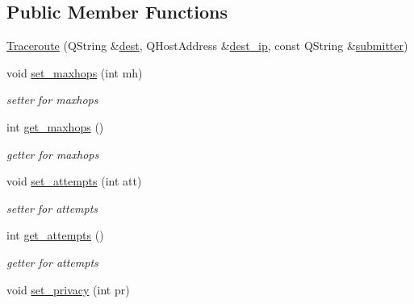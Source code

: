 \subsection*{Public Member Functions}
\begin{CompactItemize}
\item 
\hyperlink{classTraceroute_974f65271f48eabb3e4ff6be4bcada46}{Traceroute} (QString \&\hyperlink{classTraceroute_b045e5f196f24f4a3c606e0b834dbe2d}{dest}, QHostAddress \&\hyperlink{classTraceroute_4266d652220298885707ac2982b6cb98}{dest\_\-ip}, const QString \&\hyperlink{classTraceroute_eafa630c4871ad2ac89fce1aa75fe6e0}{submitter})
\item 
\hypertarget{classTraceroute_5f9a5dc58a244651e23060b3f560d31b}{
void \hyperlink{classTraceroute_5f9a5dc58a244651e23060b3f560d31b}{set\_\-maxhops} (int mh)}
\label{classTraceroute_5f9a5dc58a244651e23060b3f560d31b}

\begin{CompactList}\small\item\em setter for maxhops \item\end{CompactList}\item 
\hypertarget{classTraceroute_1c55e9ec568ebc74b73e2543554ff8e7}{
int \hyperlink{classTraceroute_1c55e9ec568ebc74b73e2543554ff8e7}{get\_\-maxhops} ()}
\label{classTraceroute_1c55e9ec568ebc74b73e2543554ff8e7}

\begin{CompactList}\small\item\em getter for maxhops \item\end{CompactList}\item 
\hypertarget{classTraceroute_ea9c00d02db1b123903e8b412210a7ca}{
void \hyperlink{classTraceroute_ea9c00d02db1b123903e8b412210a7ca}{set\_\-attempts} (int att)}
\label{classTraceroute_ea9c00d02db1b123903e8b412210a7ca}

\begin{CompactList}\small\item\em setter for attempts \item\end{CompactList}\item 
\hypertarget{classTraceroute_1a0f304f680f57f40e825bd8b29b58e5}{
int \hyperlink{classTraceroute_1a0f304f680f57f40e825bd8b29b58e5}{get\_\-attempts} ()}
\label{classTraceroute_1a0f304f680f57f40e825bd8b29b58e5}

\begin{CompactList}\small\item\em getter for attempts \item\end{CompactList}\item 
\hypertarget{classTraceroute_01cf3f6c06cc7c167d782ab2ba3f111f}{
void \hyperlink{classTraceroute_01cf3f6c06cc7c167d782ab2ba3f111f}{set\_\-privacy} (int pr)}
\label{classTraceroute_01cf3f6c06cc7c167d782ab2ba3f111f}


\end{CompactItemize}
